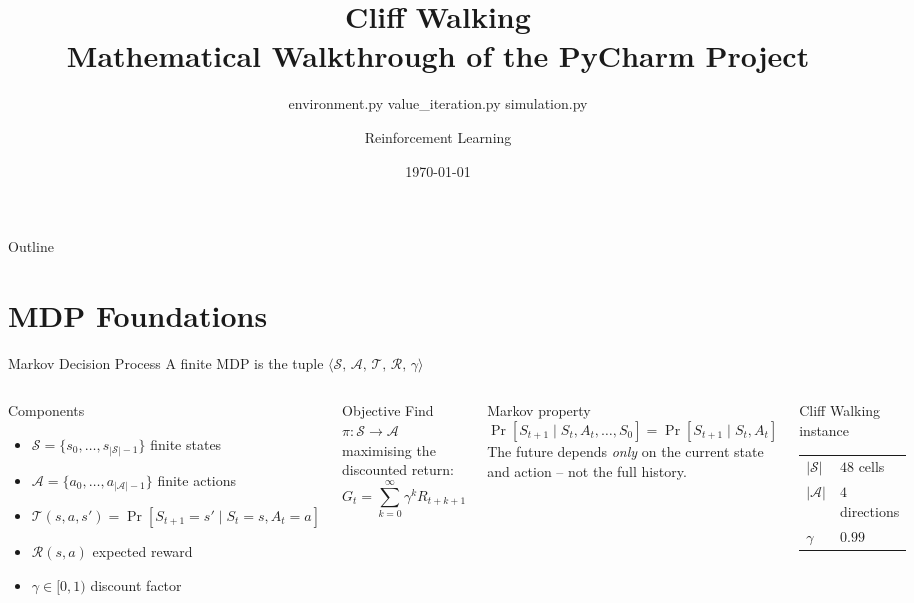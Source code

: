 \documentclass[aspectratio=169,8pt]{beamer}
\title[Cliff Walking RL]{\textbf{Cliff Walking}\\
  \large Mathematical Walkthrough of the PyCharm Project}
\subtitle{environment.py \quad value\_iteration.py \quad simulation.py}
\author{Reinforcement Learning}
\date{\today}
\newcommand{\St}{\mathcal{S}}
\newcommand{\Act}{\mathcal{A}}
\begin{document}

\begin{frame}
  \titlepage
\end{frame}

\begin{frame}{Outline}
  \tableofcontents
\end{frame}

\section{MDP Foundations}

\begin{frame}{Markov Decision Process}
  A finite MDP is the tuple
  $\langle \St,\,\Act,\,\mathcal{T},\,\mathcal{R},\,\gamma \rangle$

  \begin{columns}[T]
    \begin{block}{Components}
      \begin{itemize}
        \item $\St = \{s_0,\ldots,s_{|\St|-1}\}$ \quad finite states
        \item $\Act = \{a_0,\ldots,a_{|\Act|-1}\}$ \quad finite actions
        \item $\mathcal{T}(s,a,s')=\Pr[S_{t+1}{=}s'\mid S_t{=}s,A_t{=}a]$
        \item $\mathcal{R}(s,a)$ \quad expected reward
        \item $\gamma\in[0,1)$ \quad discount factor
      \end{itemize}
    \end{block}
    \begin{block}{Objective}
      Find $\pi:\St\!\to\!\Act$ maximising the discounted return:
      \[
        G_t = \sum_{k=0}^{\infty}\gamma^{k}R_{t+k+1}
      \]
    \end{block}

    \begin{alertblock}{Markov property}
      \[
        \Pr[S_{t+1}\mid S_t,A_t,\ldots,S_0]
        = \Pr[S_{t+1}\mid S_t,A_t]
      \]
      The future depends \emph{only} on the current state
      and action -- not the full history.
    \end{alertblock}
    \begin{block}{Cliff Walking instance}
      \begin{tabular}{ll}
        $|\St|$ & $48$ cells \\
        $|\Act|$ & $4$ directions \\
        $\gamma$ & $0.99$ \\
      \end{tabular}
    \end{block}
  \end{columns}
\end{frame}
\end{document}
